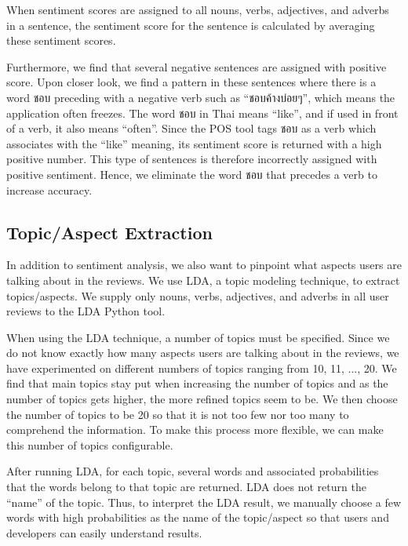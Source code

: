 When sentiment scores are assigned to all nouns, verbs, adjectives, and adverbs in a sentence, the sentiment score for the sentence is calculated by averaging these sentiment scores. 

Furthermore, we find that several negative sentences are assigned with positive score. Upon closer look, we find a pattern in these sentences where there is a word {ชอบ} preceding with a negative verb such as \enquote{{ชอบค้างบ่อยๆ}}, which means the application often freezes. The word {ชอบ} in Thai means \enquote{like}, and if used in front of a verb, it also means \enquote{often}. Since the POS tool tags {ชอบ} as a verb which associates with the \enquote{like} meaning, its sentiment score is returned with a high positive number. This type of sentences is therefore incorrectly assigned with positive sentiment. Hence, we eliminate the word {ชอบ} that precedes a verb to increase accuracy.

\subsection{Topic/Aspect Extraction}
In addition to sentiment analysis, we also want to pinpoint what aspects users are talking about in the reviews. We use LDA, a topic modeling technique, to extract topics/aspects. We supply only nouns, verbs, adjectives, and adverbs in all user reviews to the LDA Python tool. 

When using the LDA technique, a number of topics must be specified. Since we do not know exactly how many aspects users are talking about in the reviews, we have experimented on different numbers of topics ranging from 10, 11, ..., 20. We find that main topics stay put when increasing the number of topics and as the number of topics gets higher, the more refined topics seem to be. We then choose the number of topics to be 20 so that it is not too few nor too many to comprehend the information. To make this process more flexible, we can make this number of topics configurable.

After running LDA, for each topic, several words and associated probabilities that the words belong to that topic are returned. LDA does not return the \enquote{name} of the topic. Thus, to interpret the LDA result, we manually choose a few words with high probabilities as the name of the topic/aspect so that users and developers can easily understand results.

